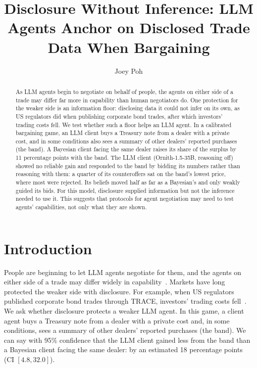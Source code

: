 \documentclass[sigconf]{acmart}
\begin{document}
\title{Disclosure Without Inference: LLM Agents Anchor on Disclosed Trade Data When Bargaining}

\author{Joey Poh}

\begin{abstract}
As LLM agents begin to negotiate on behalf of people, the agents on either side of a trade may differ far more in capability than human negotiators do. One protection for the weaker side is an information floor: disclosing data it could not infer on its own, as US regulators did when publishing corporate bond trades, after which investors' trading costs fell. We test whether such a floor helps an LLM agent. In a calibrated bargaining game, an LLM client buys a Treasury note from a dealer with a private cost, and in some conditions also sees a summary of other dealers' reported purchases (the band). A Bayesian client facing the same dealer raises its share of the surplus by 11 percentage points with the band. The LLM client (Ornith-1.5-35B, reasoning off) showed no reliable gain and responded to the band by bidding its numbers rather than reasoning with them: a quarter of its counteroffers sat on the band's lowest price, where most were rejected. Its beliefs moved half as far as a Bayesian's and only weakly guided its bids. For this model, disclosure supplied information but not the inference needed to use it. This suggests that protocols for agent negotiation may need to test agents' capabilities, not only what they are shown.
\end{abstract}

\maketitle
\setlength{\parskip}{0.3\baselineskip}
\section{Introduction}
People are beginning to let LLM agents negotiate for them, and the agents on either side of a trade may differ widely in capability~\cite{agiinstitutions2026negotiation}. Markets have long protected the weaker side with disclosure. For example, when US regulators published corporate bond trades through TRACE, investors' trading costs fell~\cite{bessembinder2006market}. We ask whether disclosure protects a weaker LLM agent. In this game, a client agent buys a Treasury note from a dealer with a private cost and, in some conditions, sees a summary of other dealers' reported purchases (the band). We can say with 95\% confidence that the LLM client gained less from the band than a Bayesian client facing the same dealer: by an estimated 18 percentage points (CI $[4.8, 32.0]$).
\end{document}
